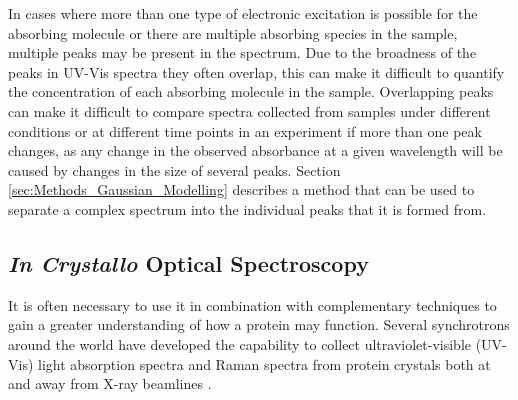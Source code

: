 In cases where more than one type of electronic excitation is possible for the absorbing molecule or there are multiple absorbing species in the sample, multiple peaks may be present in the spectrum. Due to the broadness of the peaks in UV-Vis spectra they often overlap, this can make it difficult to quantify the concentration of each absorbing molecule in the sample. Overlapping peaks can make it difficult to compare spectra collected from samples under different conditions or at different time points in an experiment if more than one peak changes, as any change in the observed absorbance at a given wavelength will be caused by changes in the size of several peaks. Section \ref{sec:Methods_Gaussian_Modelling} describes a method that can be used to separate a complex spectrum into the individual peaks that it is formed from.   



%
%
\newpage 
\subsection{\textit{In Crystallo} Optical Spectroscopy}
It is often necessary to use it in combination with complementary techniques to gain a greater understanding of how a protein may function. Several synchrotrons around the world have developed the capability to collect ultraviolet-visible (UV-Vis) light absorption spectra and Raman spectra from protein crystals both at and away from X-ray beamlines \cite{Pearson2009}.  \par 

